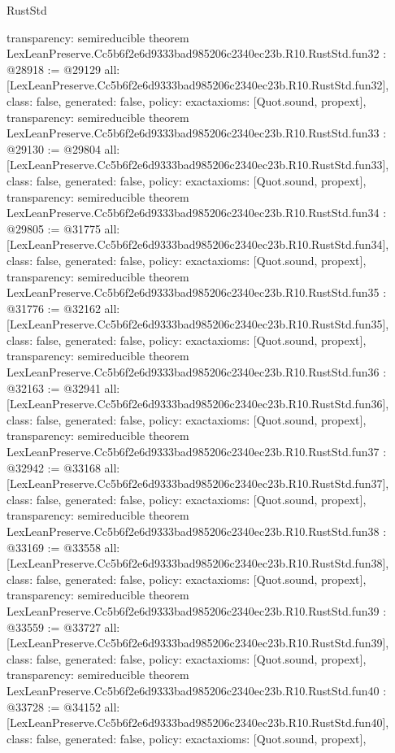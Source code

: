 \begin{lexlean}{RustStd}
\begin{coremodule}
{  transparency: semireducible
}
theorem LexLeanPreserve.Cc5b6f2e6d9333bad985206c2340ec23b.R10.RustStd.fun32 : @28918 := @29129 {
  all: [LexLeanPreserve.Cc5b6f2e6d9333bad985206c2340ec23b.R10.RustStd.fun32],
  class: false,
  generated: false,
  policy: exact{axioms: [Quot.sound, propext]},
  transparency: semireducible
}
theorem LexLeanPreserve.Cc5b6f2e6d9333bad985206c2340ec23b.R10.RustStd.fun33 : @29130 := @29804 {
  all: [LexLeanPreserve.Cc5b6f2e6d9333bad985206c2340ec23b.R10.RustStd.fun33],
  class: false,
  generated: false,
  policy: exact{axioms: [Quot.sound, propext]},
  transparency: semireducible
}
theorem LexLeanPreserve.Cc5b6f2e6d9333bad985206c2340ec23b.R10.RustStd.fun34 : @29805 := @31775 {
  all: [LexLeanPreserve.Cc5b6f2e6d9333bad985206c2340ec23b.R10.RustStd.fun34],
  class: false,
  generated: false,
  policy: exact{axioms: [Quot.sound, propext]},
  transparency: semireducible
}
theorem LexLeanPreserve.Cc5b6f2e6d9333bad985206c2340ec23b.R10.RustStd.fun35 : @31776 := @32162 {
  all: [LexLeanPreserve.Cc5b6f2e6d9333bad985206c2340ec23b.R10.RustStd.fun35],
  class: false,
  generated: false,
  policy: exact{axioms: [Quot.sound, propext]},
  transparency: semireducible
}
theorem LexLeanPreserve.Cc5b6f2e6d9333bad985206c2340ec23b.R10.RustStd.fun36 : @32163 := @32941 {
  all: [LexLeanPreserve.Cc5b6f2e6d9333bad985206c2340ec23b.R10.RustStd.fun36],
  class: false,
  generated: false,
  policy: exact{axioms: [Quot.sound, propext]},
  transparency: semireducible
}
theorem LexLeanPreserve.Cc5b6f2e6d9333bad985206c2340ec23b.R10.RustStd.fun37 : @32942 := @33168 {
  all: [LexLeanPreserve.Cc5b6f2e6d9333bad985206c2340ec23b.R10.RustStd.fun37],
  class: false,
  generated: false,
  policy: exact{axioms: [Quot.sound, propext]},
  transparency: semireducible
}
theorem LexLeanPreserve.Cc5b6f2e6d9333bad985206c2340ec23b.R10.RustStd.fun38 : @33169 := @33558 {
  all: [LexLeanPreserve.Cc5b6f2e6d9333bad985206c2340ec23b.R10.RustStd.fun38],
  class: false,
  generated: false,
  policy: exact{axioms: [Quot.sound, propext]},
  transparency: semireducible
}
theorem LexLeanPreserve.Cc5b6f2e6d9333bad985206c2340ec23b.R10.RustStd.fun39 : @33559 := @33727 {
  all: [LexLeanPreserve.Cc5b6f2e6d9333bad985206c2340ec23b.R10.RustStd.fun39],
  class: false,
  generated: false,
  policy: exact{axioms: [Quot.sound, propext]},
  transparency: semireducible
}
theorem LexLeanPreserve.Cc5b6f2e6d9333bad985206c2340ec23b.R10.RustStd.fun40 : @33728 := @34152 {
  all: [LexLeanPreserve.Cc5b6f2e6d9333bad985206c2340ec23b.R10.RustStd.fun40],
  class: false,
  generated: false,
  policy: exact{axioms: [Quot.sound, propext]},
}
\end{coremodule}
\end{lexlean}
